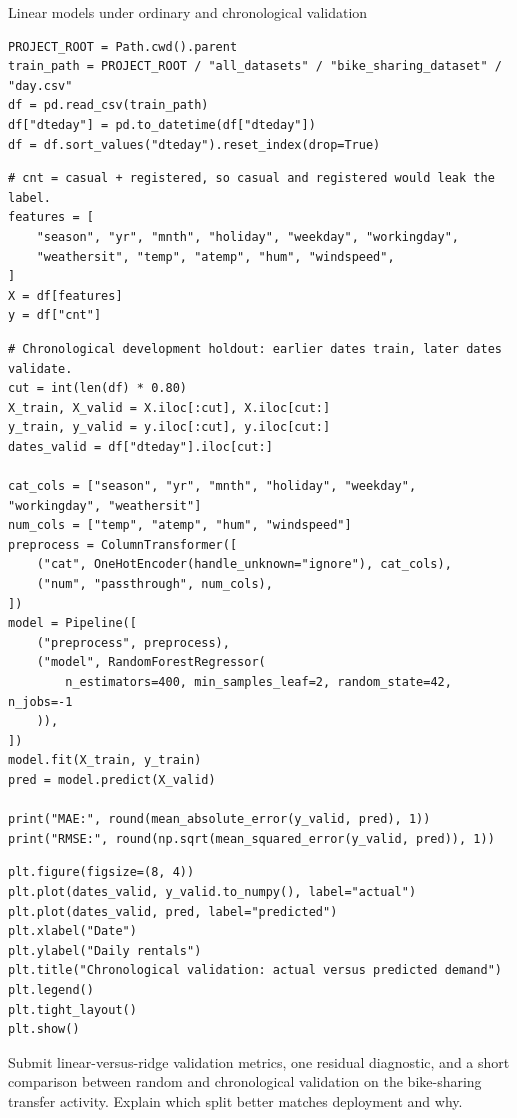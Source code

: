 \begin{labproject}{Linear models under ordinary and chronological validation}
\begin{lstlisting}[style=mlpython]
PROJECT_ROOT = Path.cwd().parent
train_path = PROJECT_ROOT / "all_datasets" / "bike_sharing_dataset" / "day.csv"
df = pd.read_csv(train_path)
df["dteday"] = pd.to_datetime(df["dteday"])
df = df.sort_values("dteday").reset_index(drop=True)
\end{lstlisting}

\begin{lstlisting}[style=mlpython]
# cnt = casual + registered, so casual and registered would leak the label.
features = [
    "season", "yr", "mnth", "holiday", "weekday", "workingday",
    "weathersit", "temp", "atemp", "hum", "windspeed",
]
X = df[features]
y = df["cnt"]
\end{lstlisting}

\begin{lstlisting}[style=mlpython]
# Chronological development holdout: earlier dates train, later dates validate.
cut = int(len(df) * 0.80)
X_train, X_valid = X.iloc[:cut], X.iloc[cut:]
y_train, y_valid = y.iloc[:cut], y.iloc[cut:]
dates_valid = df["dteday"].iloc[cut:]

cat_cols = ["season", "yr", "mnth", "holiday", "weekday", "workingday", "weathersit"]
num_cols = ["temp", "atemp", "hum", "windspeed"]
preprocess = ColumnTransformer([
    ("cat", OneHotEncoder(handle_unknown="ignore"), cat_cols),
    ("num", "passthrough", num_cols),
])
model = Pipeline([
    ("preprocess", preprocess),
    ("model", RandomForestRegressor(
        n_estimators=400, min_samples_leaf=2, random_state=42, n_jobs=-1
    )),
])
model.fit(X_train, y_train)
pred = model.predict(X_valid)

print("MAE:", round(mean_absolute_error(y_valid, pred), 1))
print("RMSE:", round(np.sqrt(mean_squared_error(y_valid, pred)), 1))
\end{lstlisting}

\begin{lstlisting}[style=mlpython]
plt.figure(figsize=(8, 4))
plt.plot(dates_valid, y_valid.to_numpy(), label="actual")
plt.plot(dates_valid, pred, label="predicted")
plt.xlabel("Date")
plt.ylabel("Daily rentals")
plt.title("Chronological validation: actual versus predicted demand")
plt.legend()
plt.tight_layout()
plt.show()
\end{lstlisting}


\end{labproject}

\begin{labdeliverable}
Submit linear-versus-ridge validation metrics, one residual diagnostic, and a short comparison between random and chronological validation on the bike-sharing transfer activity. Explain which split better matches deployment and why.
\end{labdeliverable}
